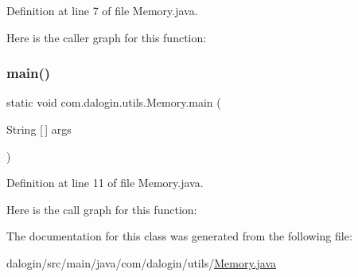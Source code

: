 Definition at line 7 of file Memory.\+java.

Here is the caller graph for this function\+:
\mbox{\label{classcom_1_1dalogin_1_1utils_1_1_memory_af2e3afdc219d69338f1301fee6081a35}} 
\subsubsection{\texorpdfstring{main()}{main()}}
{\footnotesize\ttfamily static void com.\+dalogin.\+utils.\+Memory.\+main (\begin{DoxyParamCaption}\item[{String \mbox{[}$\,$\mbox{]}}]{args }\end{DoxyParamCaption})\hspace{0.3cm}{\ttfamily [static]}}



Definition at line 11 of file Memory.\+java.

Here is the call graph for this function\+:


The documentation for this class was generated from the following file\+:\begin{DoxyCompactItemize}
\item 
dalogin/src/main/java/com/dalogin/utils/\hyperlink{_memory_8java}{Memory.\+java}\end{DoxyCompactItemize}
